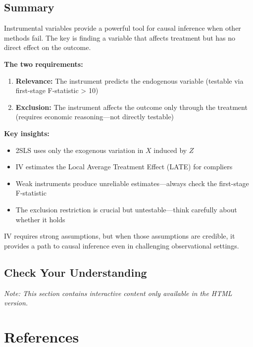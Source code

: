 \documentclass[
  letterpaper,
  DIV=11,
  numbers=noendperiod]{scrreprt}
\providecommand{\tightlist}{%
  \setlength{\itemsep}{0pt}\setlength{\parskip}{0pt}}
\begin{document}
\section{Summary}\label{summary-9}

Instrumental variables provide a powerful tool for causal inference when
other methods fail. The key is finding a variable that affects treatment
but has no direct effect on the outcome.

\textbf{The two requirements:}

\begin{enumerate}
\def\labelenumi{\arabic{enumi}.}
\tightlist
\item
  \textbf{Relevance:} The instrument predicts the endogenous variable
  (testable via first-stage F-statistic \textgreater{} 10)
\item
  \textbf{Exclusion:} The instrument affects the outcome only through
  the treatment (requires economic reasoning---not directly testable)
\end{enumerate}

\textbf{Key insights:}

\begin{itemize}
\tightlist
\item
  2SLS uses only the exogenous variation in \(X\) induced by \(Z\)
\item
  IV estimates the Local Average Treatment Effect (LATE) for compliers
\item
  Weak instruments produce unreliable estimates---always check the
  first-stage F-statistic
\item
  The exclusion restriction is crucial but untestable---think carefully
  about whether it holds
\end{itemize}

IV requires strong assumptions, but when those assumptions are credible,
it provides a path to causal inference even in challenging observational
settings.

\section{Check Your Understanding}\label{check-your-understanding-12}

\emph{Note: This section contains interactive content only available in
the HTML version.}


\chapter*{References}\label{references}
\end{document}
